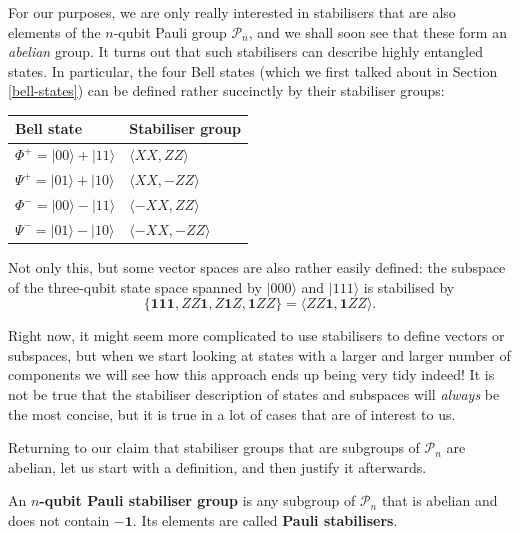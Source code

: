 \documentclass[fleqn,a4paper]{article}
\newenvironment{idea}{\everypar{\setlength{\parindent}{1.5em}}}{}
\theoremstyle{definition}
\theoremstyle{definition}
\theoremstyle{definition}
\theoremstyle{definition}
\theoremstyle{remark}
\begin{document}
For our purposes, we are only really interested in stabilisers that are also elements of the \(n\)-qubit Pauli group \(\mathcal{P}_n\), and we shall soon see that these form an \emph{abelian} group.
It turns out that such stabilisers can describe highly entangled states.
In particular, the four Bell states (which we first talked about in Section \ref{bell-states}) can be defined rather succinctly by their stabiliser groups:

\begin{longtable}[]{@{}ll@{}}
\toprule()
Bell state & Stabiliser group \\
\midrule()
\endhead
\(\Phi^+=|00\rangle+|11\rangle\) & \(\langle XX,ZZ\rangle\) \\
\(\Psi^+=|01\rangle+|10\rangle\) & \(\langle XX,-ZZ\rangle\) \\
\(\Phi^-=|00\rangle-|11\rangle\) & \(\langle -XX,ZZ\rangle\) \\
\(\Psi^-=|01\rangle-|10\rangle\) & \(\langle -XX,-ZZ\rangle\) \\
\bottomrule()
\end{longtable}

Not only this, but some vector spaces are also rather easily defined: the subspace of the three-qubit state space spanned by \(|000\rangle\) and \(|111\rangle\) is stabilised by
\[
  \{\mathbf{1}\mathbf{1}\mathbf{1},ZZ\mathbf{1},Z\mathbf{1}Z,\mathbf{1}ZZ\} = \langle ZZ\mathbf{1},\mathbf{1}ZZ\rangle.
\]

Right now, it might seem more complicated to use stabilisers to define vectors or subspaces, but when we start looking at states with a larger and larger number of components we will see how this approach ends up being very tidy indeed!
It is not be true that the stabiliser description of states and subspaces will \emph{always} be the most concise, but it is true in a lot of cases that are of interest to us.

Returning to our claim that stabiliser groups that are subgroups of \(\mathcal{P}_n\) are abelian, let us start with a definition, and then justify it afterwards.

\begin{idea}
An \textbf{\(n\)-qubit Pauli stabiliser group} is any subgroup of \(\mathcal{P}_n\) that is abelian and does not contain \(-\mathbf{1}\).
Its elements are called \textbf{Pauli stabilisers}.

\end{idea}
\end{document}
